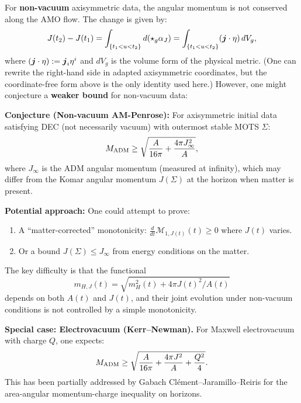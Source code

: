 \begin{remark}\label{rem:non-vacuum}
For \textbf{non-vacuum} axisymmetric data, the angular momentum is not conserved along the AMO flow. The change is given by:
\[
J(t_2) - J(t_1) = \int_{\{t_1 < u < t_2\}} d(\star_g\alpha_J) = \int_{\{t_1 < u < t_2\}} (\boldsymbol{j}\cdot\eta)\, dV_g,
\]
where $(\boldsymbol{j}\cdot\eta):=\boldsymbol{j}_i\eta^i$ and $dV_g$ is the volume form of the physical metric. (One can rewrite the right-hand side in adapted axisymmetric coordinates, but the coordinate-free form above is the only identity used here.)
However, one might conjecture a \textbf{weaker bound} for non-vacuum data:

\textbf{Conjecture (Non-vacuum AM-Penrose):} For axisymmetric initial data satisfying DEC (not necessarily vacuum) with outermost stable MOTS $\Sigma$:
\[
M_{\mathrm{ADM}} \geq \sqrt{\frac{A}{16\pi} + \frac{4\pi J_{\infty}^2}{A}},
\]
where $J_\infty$ is the ADM angular momentum (measured at infinity), which may differ from the Komar angular momentum $J(\Sigma)$ at the horizon when matter is present.

\textbf{Potential approach:} One could attempt to prove:
\begin{enumerate}
    \item A ``matter-corrected'' monotonicity: $\frac{d}{dt}\mathcal{M}_{1,J(t)}(t) \geq 0$ where $J(t)$ varies.
    \item Or a bound $J(\Sigma) \leq J_\infty$ from energy conditions on the matter.
\end{enumerate}

The key difficulty is that the functional
\[
m_{H,J}(t) = \sqrt{m_H^2(t) + 4\pi J(t)^2/A(t)}
\]
depends on both $A(t)$ and $J(t)$, and their joint evolution under non-vacuum conditions is not controlled by a simple monotonicity.

\textbf{Special case: Electrovacuum (Kerr--Newman).} For Maxwell electrovacuum with charge $Q$, one expects:
\[
M_{\mathrm{ADM}} \geq \sqrt{\frac{A}{16\pi} + \frac{4\pi J^2}{A} + \frac{Q^2}{4}}.
\]
This has been partially addressed by Gabach Cl\'ement--Jaramillo--Reiris \cite{gabachclement2015} for the area-angular momentum-charge inequality on horizons.


\end{remark}
